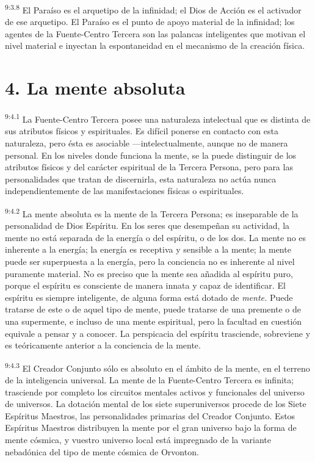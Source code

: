 \par
\textsuperscript{9:3.8} El Paraíso es el arquetipo de la infinidad; el Dios de Acción es el activador de ese arquetipo. El Paraíso es el punto de apoyo material de la infinidad; los agentes de la Fuente-Centro Tercera son las palancas inteligentes que motivan el nivel material e inyectan la espontaneidad en el mecanismo de la creación física.

\section*{4. La mente absoluta}
\par
\textsuperscript{9:4.1} La Fuente-Centro Tercera posee una naturaleza intelectual que es distinta de sus atributos físicos y espirituales. Es difícil ponerse en contacto con esta naturaleza, pero ésta es asociable ---intelectualmente, aunque no de manera personal. En los niveles donde funciona la mente, se la puede distinguir de los atributos físicos y del carácter espiritual de la Tercera Persona, pero para las personalidades que tratan de discernirla, esta naturaleza no actúa nunca independientemente de las manifestaciones físicas o espirituales.

\par
\textsuperscript{9:4.2} La mente absoluta es la mente de la Tercera Persona; es inseparable de la personalidad de Dios Espíritu. En los seres que desempeñan su actividad, la mente no está separada de la energía o del espíritu, o de los dos. La mente no es inherente a la energía; la energía es receptiva y sensible a la mente; la mente puede ser superpuesta a la energía, pero la conciencia no es inherente al nivel puramente material. No es preciso que la mente sea añadida al espíritu puro, porque el espíritu es consciente de manera innata y capaz de identificar. El espíritu es siempre inteligente, de alguna forma está dotado de \textit{mente.} Puede tratarse de este o de aquel tipo de mente, puede tratarse de una premente o de una supermente, e incluso de una mente espiritual, pero la facultad en cuestión equivale a pensar y a conocer. La perspicacia del espíritu trasciende, sobreviene y es teóricamente anterior a la conciencia de la mente.

\par
\textsuperscript{9:4.3} El Creador Conjunto sólo es absoluto en el ámbito de la mente, en el terreno de la inteligencia universal. La mente de la Fuente-Centro Tercera es infinita; trasciende por completo los circuitos mentales activos y funcionales del universo de universos. La dotación mental de los siete superuniversos procede de los Siete Espíritus Maestros, las personalidades primarias del Creador Conjunto. Estos Espíritus Maestros distribuyen la mente por el gran universo bajo la forma de mente cósmica, y vuestro universo local está impregnado de la variante nebadónica del tipo de mente cósmica de Orvonton.

